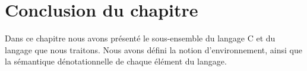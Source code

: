\section*{Conclusion du chapitre}

Dans ce chapitre nous avons présenté le sous-ensemble du langage C et du
langage \eacsl que nous traitons.
Nous avons défini la notion d'environnement, ainsi que la sémantique
dénotationnelle de chaque élément du langage.

